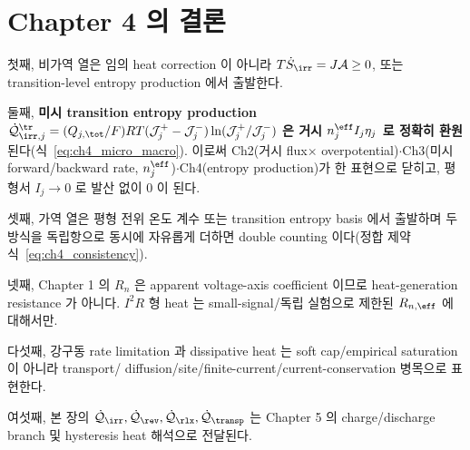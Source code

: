 \section{Chapter 4 의 결론}\label{sec:ch4_concl}
첫째, 비가역 열은 임의 heat correction 이 아니라 $T\dot S_{\irr}=J\mathcal A\ge0$, 또는 transition-level
entropy production 에서 출발한다.

둘째, \textbf{미시 transition entropy production $\dot{\mathcal Q}_{\irr,j}^{\tr}=(Q_{j,\tot}/F)RT(\mathcal J_j^+-\mathcal J_j^-)\ln(\mathcal J_j^+/\mathcal J_j^-)$
은 거시 $n_j^{\eff}I_j\eta_j$ 로 정확히 환원}된다(식~\eqref{eq:ch4_micro_macro}). 이로써 Ch2(거시 flux$\times$
overpotential)$\cdot$Ch3(미시 forward/backward rate, $n_j^{\eff}$)$\cdot$Ch4(entropy production)가 한 표현으로
닫히고, 평형서 $I_j\to0$ 로 발산 없이 0 이 된다.

셋째, 가역 열은 평형 전위 온도 계수 또는 transition entropy basis 에서 출발하며 두 방식을 독립항으로 동시에
자유롭게 더하면 double counting 이다(정합 제약 식~\eqref{eq:ch4_consistency}).

넷째, Chapter 1 의 $R_n$ 은 apparent voltage-axis coefficient 이므로 heat-generation resistance 가 아니다.
$I^2R$ 형 heat 는 small-signal/독립 실험으로 제한된 $R_{n,\eff}$ 에 대해서만.

다섯째, 강구동 rate limitation 과 dissipative heat 는 soft cap/empirical saturation 이 아니라 transport/
diffusion/site/finite-current/current-conservation 병목으로 표현한다.

여섯째, 본 장의 $\dot{\mathcal Q}_{\irr},\dot{\mathcal Q}_{\rev},\dot{\mathcal Q}_{\rlx},\dot{\mathcal Q}_{\transp}$
는 Chapter 5 의 charge/discharge branch 및 hysteresis heat 해석으로 전달된다.


